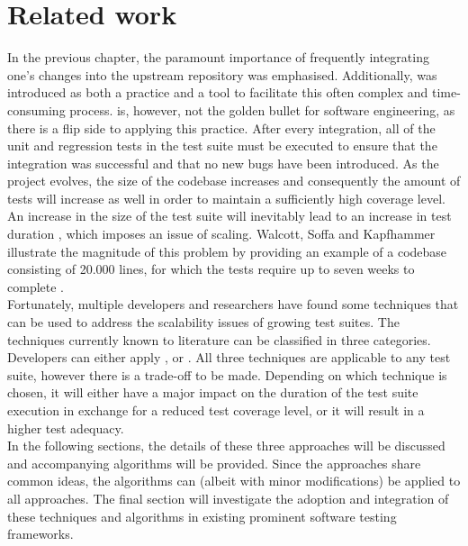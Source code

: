 
\chapter{Related work}\label{chap:related-work}
In the previous chapter, the paramount importance of frequently integrating one's changes into the upstream repository was emphasised. Additionally, \CI{} was introduced as both a practice and a tool to facilitate this often complex and time-consuming process. \CI{} is, however, not the golden bullet for software engineering, as there is a flip side to applying this practice. After every integration, all of the unit and regression tests in the test suite must be executed to ensure that the integration was successful and that no new bugs have been introduced. As the project evolves, the size of the codebase increases and consequently the amount of tests will increase as well in order to maintain a sufficiently high coverage level. An increase in the size of the test suite will inevitably lead to an increase in test duration \cite{evaluationoftestsuiteminimization}, which imposes an issue of scaling. Walcott, Soffa and Kapfhammer illustrate the magnitude of this problem by providing an example of a codebase consisting of 20.000 lines, for which the tests require up to seven weeks to complete \cite{10.1145/1146238.1146240}.\\

\noindent Fortunately, multiple developers and researchers have found some techniques that can be used to address the scalability issues of growing test suites. The techniques currently known to literature can be classified in three categories. Developers can either apply \emph{\tsm{}}, \emph{\tcs{}} or \emph{\tcp{}} \cite{evaluationoftestsuiteminimization}. All three techniques are applicable to any test suite, however there is a trade-off to be made. Depending on which technique is chosen, it will either have a major impact on the duration of the test suite execution in exchange for a reduced test coverage level, or it will result in a higher test adequacy.\\

\noindent In the following sections, the details of these three approaches will be discussed and accompanying algorithms will be provided. Since the approaches share common ideas, the algorithms can (albeit with minor modifications) be applied to all approaches. The final section will investigate the adoption and integration of these techniques and algorithms in existing prominent software testing frameworks.


\newpage

\newpage
